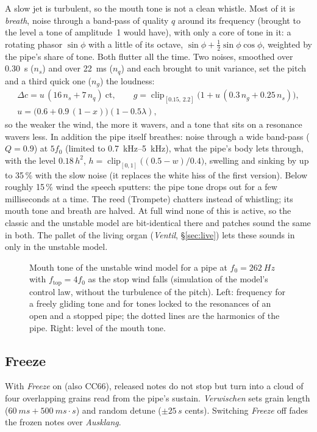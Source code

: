 \documentclass[11pt,a4paper,parskip=half,DIV=11,toc=bibliography]{scrartcl}
\newcommand{\ui}[1]{\emph{#1}}                 %
\begin{document}
A slow jet is turbulent, so the mouth tone is not a clean whistle. Most of it is \emph{breath}, noise through a band-pass of
quality $q$ around its frequency (brought to the level a tone of amplitude~1 would have), with only a core of tone in it: a rotating
phasor $\sin\phi$ with a little of its octave, $\sin\phi+\tfrac12\sin\phi\cos\phi$, weighted by the pipe's share of tone. Both flutter
all the time. Two noises, smoothed over \SI{0.30}{s} ($n_s$) and over \SI{22}{ms} ($n_q$) and each brought to unit variance, set the pitch
and a third quick one ($n_g$) the loudness:
\begin{gather}
  \Delta c = u\,(16\,n_s + 7\,n_q)\ \text{ct},\qquad
  g = \operatorname{clip}_{[0.15,\,2.2]}\bigl(1 + u\,(0.3\,n_g + 0.25\,n_s)\bigr),\\
  u = \bigl(0.6+0.9\,(1-x)\bigr)(1-0.5\lambda),
\end{gather}
so the weaker the wind, the more it wavers, and a tone that sits on a resonance wavers less. In addition the pipe itself breathes:
noise through a wide band-pass ($Q=0.9$) at $5f_0$ (limited to \SIrange{0.7}{5}{kHz}), what the pipe's body lets through, with the level
$0.18\,h^2$, $h=\operatorname{clip}_{[0,1]}\bigl((0.5-w)/0.4\bigr)$, swelling and sinking by up to 35\,\% with the slow noise (it replaces the
white hiss of the first version). Below roughly 15\,\% wind the speech sputters: the pipe tone drops out for a few milliseconds at a
time. The reed (Trompete) chatters instead of whistling; its mouth tone and breath are halved. At full wind none of this is active, so the
classic and the unstable model are bit-identical there and patches sound the same in both. The pallet of the living organ
(\ui{Ventil}, \S\ref{sec:live}) lets these sounds in only in the unstable model.

\begin{figure}[h]
\centering
\resizebox{\linewidth}{!}{}
\caption{Mouth tone of the unstable wind model for a pipe at $f_0=\SI{262}{Hz}$ with $f_\text{top}=4f_0$ as the stop wind falls
(simulation of the model's control law, without the turbulence of the pitch). Left: frequency for a freely gliding tone and for tones locked
to the resonances of an open and a stopped pipe; the dotted lines are the harmonics of the pipe. Right: level of the mouth tone.}
\label{fig:edgetone}
\end{figure}

\subsection{Freeze}
With \ui{Freeze} on (also CC66), released notes do not stop but turn into a cloud of four overlapping
grains read from the pipe's sustain. \ui{Verwischen} sets grain length ($\SI{60}{ms}+\SI{500}{ms}\cdot
s$) and random detune ($\pm25\,s$ cents). Switching \ui{Freeze} off fades the frozen notes over
\ui{Ausklang}.
\end{document}
